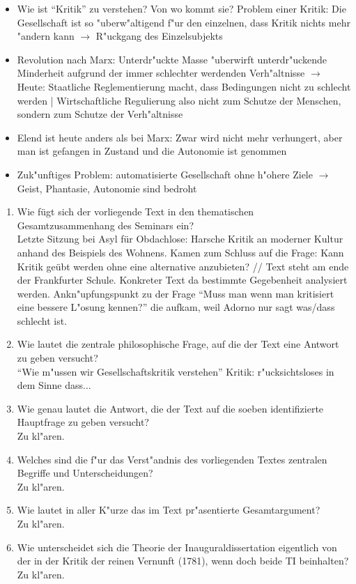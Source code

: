 \documentclass[emulatestandardclasses]{scrartcl}
\begin{document}
\begin{itemize}
  \item Wie ist "`Kritik"' zu verstehen? Von wo kommt sie? Problem einer Kritik: Die Gesellschaft ist so "uberw"altigend f"ur den einzelnen, dass Kritik nichts mehr "andern kann $\rightarrow$ R"uckgang des Einzelsubjekts
  \item Revolution nach Marx: Unterdr"uckte Masse "uberwirft unterdr"uckende Minderheit aufgrund der immer schlechter werdenden Verh"altnisse $\rightarrow$ Heute: Staatliche Reglementierung macht, dass Bedingungen nicht zu schlecht werden | Wirtschaftliche Regulierung also nicht zum Schutze der Menschen, sondern zum Schutze der Verh"altnisse
   \item Elend ist heute anders als bei Marx: Zwar wird nicht mehr verhungert, aber man ist gefangen in Zustand und die Autonomie ist genommen
  \item Zuk"unftiges Problem: automatisierte Gesellschaft ohne h"ohere Ziele $\rightarrow$ Geist, Phantasie, Autonomie sind bedroht

\end{itemize}


\begin{enumerate}
  \item {\color{NavyBlue}Wie fügt sich der vorliegende Text in den thematischen Gesamtzusammenhang des Seminars ein?}\\
{\color{ForestGreen} Letzte Sitzung bei Asyl für Obdachlose: Harsche Kritik an moderner Kultur anhand des Beispiels des Wohnens. Kamen zum Schluss auf die Frage: Kann Kritik geübt werden ohne eine alternative anzubieten? // Text steht am ende der Frankfurter Schule. Konkreter Text da bestimmte Gegebenheit analysiert werden. Ankn"upfungspunkt zu der Frage "`Muss man wenn man kritisiert eine bessere L"osung kennen?"' die aufkam, weil Adorno nur sagt was/dass schlecht ist.}
  \item {\color{NavyBlue}Wie lautet die zentrale philosophische Frage, auf die der Text eine Antwort zu geben versucht?}\\
{\color{ForestGreen} "`Wie m"ussen wir Gesellschaftskritik verstehen"' Kritik: r"ucksichtsloses in dem Sinne dass...}
    \item {\color{NavyBlue} Wie genau lautet die Antwort, die der Text auf die soeben identifizierte Hauptfrage zu geben versucht?}\\
{\color{ForestGreen} Zu kl"aren.}
    \item {\color{NavyBlue} Welches sind die f"ur das Verst"andnis des vorliegenden Textes zentralen Begriffe und Unterscheidungen?}\\
{\color{ForestGreen} Zu kl"aren.}
    \item {\color{NavyBlue} Wie lautet in aller K"urze das im Text pr"asentierte Gesamtargument?}\\
{\color{ForestGreen} Zu kl"aren.}
    \item {\color{NavyBlue} Wie unterscheidet sich die Theorie der Inauguraldissertation
eigentlich von der in der Kritik der reinen Vernunft (1781), wenn doch beide TI beinhalten?}\\
{\color{ForestGreen} Zu kl"aren.}
\end{enumerate}
\end{document}

